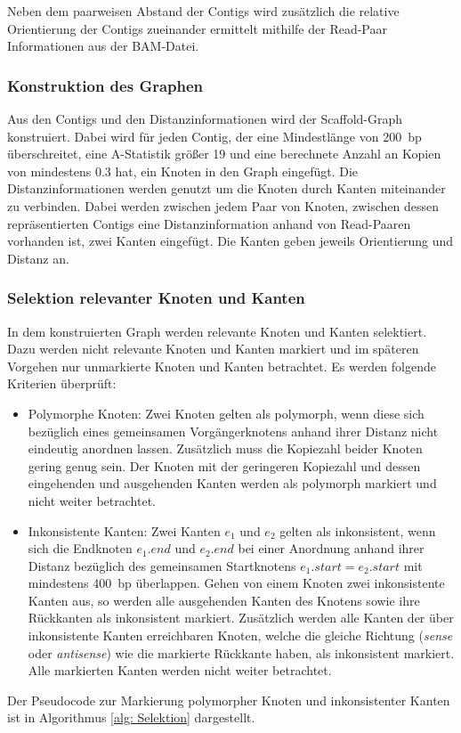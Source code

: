 \documentclass[a4paper,11pt,parskip,abstract=on]{scrartcl}
\begin{document}
Neben dem paarweisen Abstand der Contigs wird zusätzlich die relative
Orientierung der Contigs zueinander ermittelt mithilfe der Read-Paar
Informationen aus der BAM-Datei.

\subsubsection{Konstruktion des Graphen}
Aus den Contigs und den Distanzinformationen wird der Scaffold-Graph
konstruiert. Dabei wird für jeden Contig, der eine Mindestlänge von
\SI{200}{bp} überschreitet, eine A-Statistik größer 19 und eine berechnete
Anzahl an Kopien von mindestens \num{0.3} hat, ein Knoten in den Graph
eingefügt. Die Distanzinformationen werden genutzt um die Knoten durch
Kanten miteinander zu verbinden. Dabei werden zwischen jedem Paar von
Knoten, zwischen dessen repräsentierten Contigs eine
Distanzinformation anhand von Read-Paaren vorhanden ist, zwei Kanten
eingefügt. Die Kanten geben jeweils Orientierung und Distanz an.

\subsubsection{Selektion relevanter Knoten und Kanten}
In dem konstruierten Graph werden relevante Knoten und Kanten
selektiert. Dazu werden nicht relevante Knoten und Kanten markiert und
im späteren Vorgehen nur unmarkierte Knoten und Kanten betrachtet. Es
werden folgende Kriterien überprüft:
\begin{itemize}
\item Polymorphe Knoten: Zwei Knoten gelten als polymorph, wenn diese
  sich bezüglich eines gemeinsamen Vorgängerknotens anhand ihrer
  Distanz nicht eindeutig anordnen lassen. Zusätzlich muss die
  Kopiezahl beider Knoten gering genug sein. Der Knoten mit der
  geringeren Kopiezahl und dessen eingehenden und ausgehenden Kanten
  werden als polymorph markiert und nicht weiter betrachtet.
\item Inkonsistente Kanten: Zwei Kanten $e_1$ und $e_2$ gelten als
  inkonsistent, wenn sich die Endknoten $e_1.end$ und $e_2.end$ bei
  einer Anordnung anhand ihrer Distanz bezüglich des gemeinsamen
  Startknotens $e_1.start = e_2.start$ mit mindestens \SI{400}{bp}
  überlappen. Gehen von einem Knoten zwei inkonsistente Kanten aus, so
  werden alle ausgehenden Kanten des Knotens sowie ihre Rückkanten als
  inkonsistent markiert. Zusätzlich werden alle Kanten der über
  inkonsistente Kanten erreichbaren Knoten, welche die gleiche Richtung
  (\textit{sense} oder \textit{antisense}) wie die markierte Rückkante
  haben, als inkonsistent markiert. Alle markierten Kanten werden
  nicht weiter betrachtet.
\end{itemize}
Der Pseudocode zur Markierung polymorpher Knoten und inkonsistenter
Kanten ist in Algorithmus \ref{alg: Selektion} dargestellt.
\end{document}
